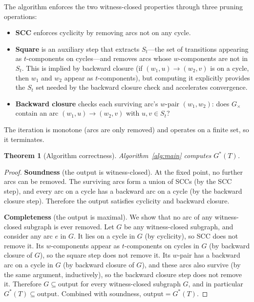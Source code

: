 \documentclass[11pt]{article}
\newtheorem{theorem}{Theorem}
\begin{document}
\medskip

The algorithm enforces the two witness-closed properties through three pruning operations:
\begin{itemize}[nosep]
\item \textbf{SCC} enforces cyclicity by removing arcs not on any cycle.
\item \textbf{Square} is an auxiliary step that extracts $S_t$---the set of transitions appearing as $t$-components on cycles---and removes arcs whose $w$-components are not in $S_t$. This is implied by backward closure (if $(w_1, u) \to (w_2, v)$ is on a cycle, then $w_1$ and $w_2$ appear as $t$-components), but computing it explicitly provides the $S_t$ set needed by the backward closure check and accelerates convergence.
\item \textbf{Backward closure} checks each surviving arc's $w$-pair $(w_1, w_2)$: does $G_\times$ contain an arc $(w_1, u) \to (w_2, v)$ with $u, v \in S_t$?
\end{itemize}

The iteration is monotone (arcs are only removed) and operates on a finite set, so it terminates.

\begin{theorem}[Algorithm correctness]
\label{thm:algo-correctness}
Algorithm~\ref{alg:main} computes $G^*(T)$.
\end{theorem}

\begin{proof}
\textbf{Soundness} (the output is witness-closed). At the fixed point, no further arcs can be removed. The surviving arcs form a union of SCCs (by the SCC step), and every arc on a cycle has a backward arc on a cycle (by the backward closure step). Therefore the output satisfies cyclicity and backward closure.

\textbf{Completeness} (the output is maximal). We show that no arc of any witness-closed subgraph is ever removed. Let $G$ be any witness-closed subgraph, and consider any arc $e$ in $G$. It lies on a cycle in $G$ (by cyclicity), so SCC does not remove it. Its $w$-components appear as $t$-components on cycles in $G$ (by backward closure of $G$), so the square step does not remove it. Its $w$-pair has a backward arc on a cycle in $G$ (by backward closure of $G$), and these arcs also survive (by the same argument, inductively), so the backward closure step does not remove it. Therefore $G \subseteq \text{output}$ for every witness-closed subgraph $G$, and in particular $G^*(T) \subseteq \text{output}$. Combined with soundness, $\text{output} = G^*(T)$.
\end{proof}
\end{document}
